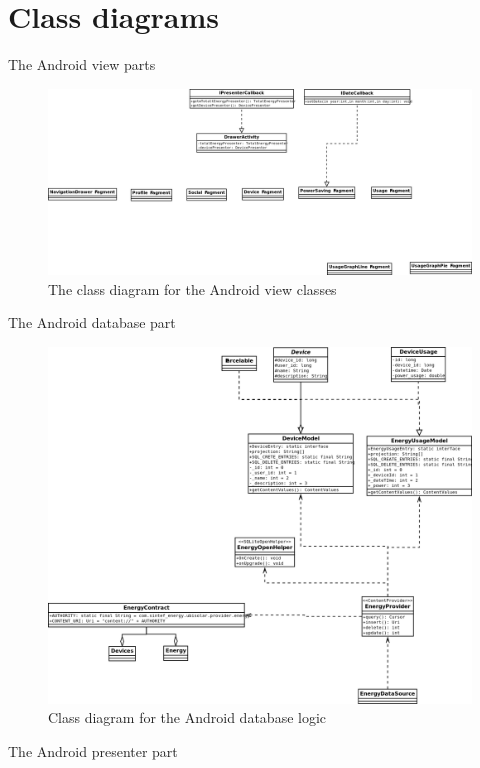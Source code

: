 \section{Class diagrams}

The Android view parts
\begin{figure}[H]
\includegraphics[width=\textwidth]{ch/architecture/fig/ClassDiagramAndroid.png}
\caption{The class diagram for the Android view classes}
\end{figure}

The Android database part
\begin{figure}[H]
\includegraphics[width=\textwidth]{ch/architecture/fig/classDiagramAndroidDatabase.png}
\caption{Class diagram for the Android database logic}
\end{figure}

The Android presenter part


